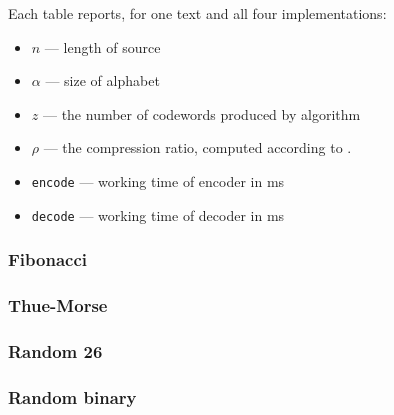 % 
Each table reports, for one text and all four implementations:
\begin{itemize}
    \item \(n\) --- length of source
    \item \(\alpha\) --- size of alphabet
    \item \(z\) --- the number of codewords produced by algorithm
    \item \(\rho\) --- the compression ratio, computed according to .
    \item \texttt{encode} --- working time of encoder in ms
    \item \texttt{decode} --- working time of decoder in ms
\end{itemize}

\subsubsection{Fibonacci}
 {
\setlength{\floatsep}{6pt plus 2pt minus 2pt}
\setlength{\textfloatsep}{6pt plus 2pt minus 2pt}
\setlength{\intextsep}{6pt plus 2pt minus 2pt}
\setlength{\abovecaptionskip}{4pt}
\setlength{\belowcaptionskip}{0pt}


}

\subsubsection{Thue-Morse}
{
\setlength{\floatsep}{6pt plus 2pt minus 2pt}
\setlength{\textfloatsep}{6pt plus 2pt minus 2pt}
\setlength{\intextsep}{6pt plus 2pt minus 2pt}
\setlength{\abovecaptionskip}{4pt}
\setlength{\belowcaptionskip}{0pt}


}

\subsubsection{Random 26}
{
\setlength{\floatsep}{6pt plus 2pt minus 2pt}
\setlength{\textfloatsep}{6pt plus 2pt minus 2pt}
\setlength{\intextsep}{6pt plus 2pt minus 2pt}
\setlength{\abovecaptionskip}{4pt}
\setlength{\belowcaptionskip}{0pt}


}

\subsubsection{Random binary}
{
\setlength{\floatsep}{6pt plus 2pt minus 2pt}
\setlength{\textfloatsep}{6pt plus 2pt minus 2pt}
\setlength{\intextsep}{6pt plus 2pt minus 2pt}
\setlength{\abovecaptionskip}{4pt}
\setlength{\belowcaptionskip}{0pt}


}

